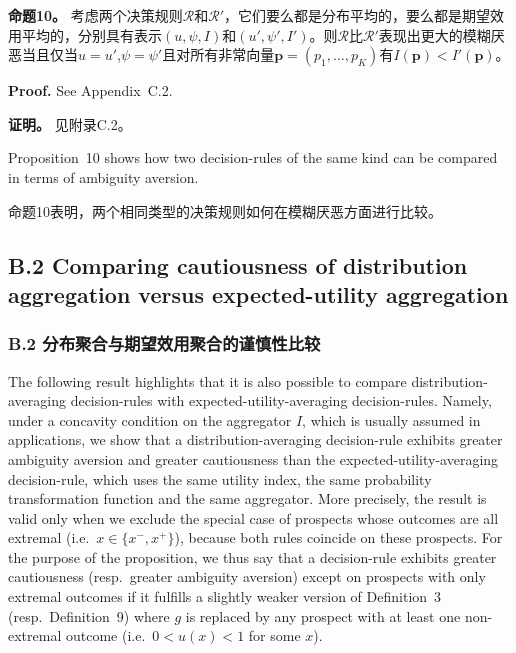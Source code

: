 \documentclass[12pt,a4paper]{article}
\newenvironment{original}
  {\par\noindent\ignorespaces}
  {\par}
\newenvironment{translation}
  {\par\noindent{\color{transblue}\ignorespaces}}
  {\par\medskip}
\begin{document}
\begin{translation}
\textbf{命题10。} 考虑两个决策规则$\mathcal{R}$和$\mathcal{R}'$，它们要么都是分布平均的，要么都是期望效用平均的，分别具有表示$(u, \psi, I)$和$(u', \psi', I')$。则$\mathcal{R}$比$\mathcal{R}'$表现出更大的模糊厌恶当且仅当$u = u'$,$\psi = \psi'$且对所有非常向量$\mathbf{p} = (p_{1}, \dots, p_{K})$有$I(\mathbf{p}) < I'(\mathbf{p})$。
\end{translation}

\begin{original}
\textbf{Proof.} See Appendix~C.2.
\end{original}

\begin{translation}
\textbf{证明。} 见附录C.2。
\end{translation}

\begin{original}
Proposition~10 shows how two decision-rules of the same kind can be compared in terms of ambiguity aversion.
\end{original}

\begin{translation}
命题10表明，两个相同类型的决策规则如何在模糊厌恶方面进行比较。
\end{translation}

\subsection*{B.2 Comparing cautiousness of distribution aggregation versus expected-utility aggregation}
{\color{transblue}\subsubsection*{B.2 分布聚合与期望效用聚合的谨慎性比较}}

\begin{original}
The following result highlights that it is also possible to compare distribution-averaging decision-rules with expected-utility-averaging decision-rules. Namely, under a concavity condition on the aggregator $I$, which is usually assumed in applications, we show that a distribution-averaging decision-rule exhibits greater ambiguity aversion and greater cautiousness than the expected-utility-averaging decision-rule, which uses the same utility index, the same probability transformation function and the same aggregator. More precisely, the result is valid only when we exclude the special case of prospects whose outcomes are all extremal (i.e.\ $x \in \{x^{-}, x^{+}\}$), because both rules coincide on these prospects. For the purpose of the proposition, we thus say that a decision-rule exhibits greater cautiousness (resp.\ greater ambiguity aversion) except on prospects with only extremal outcomes if it fulfills a slightly weaker version of Definition~3 (resp.\ Definition~9) where $g$ is replaced by any prospect with at least one non-extremal outcome (i.e.\ $0 < u(x) < 1$ for some $x$).
\end{original}
\end{document}
